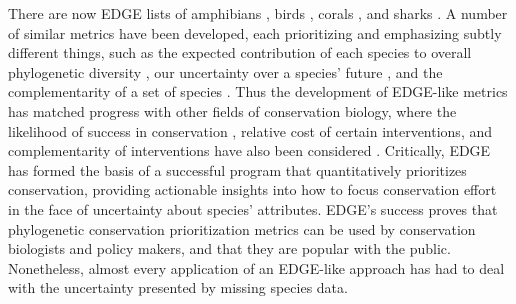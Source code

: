 \documentclass[12pt,english]{article}
\begin{document}
There are now EDGE lists of amphibians \autocite{Isaac2012}, birds \autocite{Jetz2014}, corals
\autocite{Curnick2015}, and sharks \autocite{Stein2018}. A 
number of similar metrics  have been developed,
each prioritizing and emphasizing subtly different things, such as the
expected contribution of each species to overall phylogenetic
diversity \autocite[HEDGE;][]{Steel2007}, our uncertainty over a
species' future \autocite[EDAM;][]{Pearse2015}, and the
complementarity of a set of species \autocite{Faith2008,Jensen2016}.
Thus the development of EDGE-like metrics has matched progress with other fields of conservation biology, where the
likelihood of success in conservation \autocite{Wilson2007, Mcbride2007},
relative cost of certain interventions\autocite{Naidoo2006}, and complementarity
of interventions\autocite{Pressey1993, Myers2000} have also been considered
. %
Critically, EDGE has formed the basis of a successful program that quantitatively
prioritizes conservation, providing actionable insights into how to focus
conservation effort in the face of uncertainty about species' attributes. EDGE's success proves that phylogenetic conservation prioritization metrics can be used by
conservation biologists and policy makers, and that they are popular with the public. Nonetheless, almost every application
of an EDGE-like approach has had to deal with the uncertainty presented by missing species data.
\end{document}
